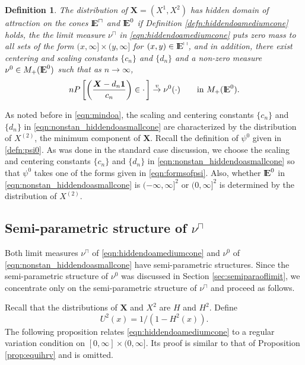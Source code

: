 \documentclass[11 pt]{amsart}
\newtheorem{defn}[thm]{Definition}
\numberwithin{equation}{section}
\begin{document}
{{\begin{defn}\label{defn:nonstansecondstage}
{\rm{ The distribution of ${\boldsymbol X} = (X^1, X^2)$ has hidden domain of attraction on the cones ${\mathop{\rm I\kern -0.20em E}\nolimits}^{\sqcap}$ and ${\mathop{\rm I\kern -0.20em E}\nolimits}^0$ if Definition \ref{defn:hiddendoamediumcone} holds, the 
the limit measure $\nu^{\sqcap}$ in \eqref{eqn:hiddendoamediumcone} puts zero mass to all sets of the form $(x, \infty] \times (y, \infty]$ for $(x, y) \in {\mathop{\rm I\kern -0.20em E}\nolimits}^{\sqcap}$, and in addition, 
there exist centering and scaling constants $\{ c_n \}$ and $\{d_n \}$ and a non-zero measure $\nu^0 \in M_+({\mathop{\rm I\kern -0.20em E}\nolimits}^0)$ such that as $n \to \infty$,
\begin{align}\label{eqn:nonstan_hiddendoasmallcone}
nP\left[ \left( \frac{     {\boldsymbol X} -d_n {\boldsymbol 1}       }{  c_n  } \right) \in
  \cdot \, \right] \stackrel{v}{\rightarrow} \nu^0(\cdot) \qquad \text{in }M_+({\mathop{\rm I\kern -0.20em E}\nolimits}^0).
\end{align}
}}
\end{defn}
As noted before in \eqref{eqn:mindoa}, the scaling and centering
constants $\{ c_n \}$ and $\{ d_n \}$ in
\eqref{eqn:nonstan_hiddendoasmallcone} are characterized by the
distribution of $X^{(2)}$, 
the minimum component of ${\boldsymbol X}$. Recall the definition of $\psi^0$
given in \eqref{defn:psi0}. As was done in the standard case
discussion, we choose the scaling and centering constants $\{ c_n \}$
and $\{ d_n \}$ in \eqref{eqn:nonstan_hiddendoasmallcone} so that
$\psi^0$ takes one of the forms given in \eqref{eqn:formsofpsi}. Also, 
{whether ${\mathop{\rm I\kern -0.20em E}\nolimits}^0$ in
\eqref{eqn:nonstan_hiddendoasmallcone} 
 is $(-\infty, \infty]^2$ or $(0,
\infty]^2$
 is determined by the
distribution of $X^{(2)}$.}

\subsection{Semi-parametric structure of
  $\nu^{\sqcap}$}\label{sec:nonstansemipara} 
Both  limit measures $\nu^{\sqcap}$ of
\eqref{eqn:hiddendoamediumcone} and $\nu^0$ of
\eqref{eqn:nonstan_hiddendoasmallcone} have semi-parametric
structures. {Since} the semi-parametric structure of $\nu^0$ was
discussed in Section \ref{sec:semiparaoflimit}, {we}
concentrate only on the semi-parametric structure of $\nu^{\sqcap}$ {and
proceed as follows.}

Recall that the distribution{s} of ${\boldsymbol X}$ and $X^2$ are  $H$ and $H^2$.  Define 
\begin{equation}\label{defn:U2}
U^2(x) = 1/(1 - H^2(x)).
\end{equation}
The following proposition relates \eqref{eqn:hiddendoamediumcone} to a
regular variation condition on $[0, \infty] \times (0, \infty]$.
Its proof is  similar to {that} of Proposition \ref{prop:equihrv} and is omitted.

}}
\end{document}
